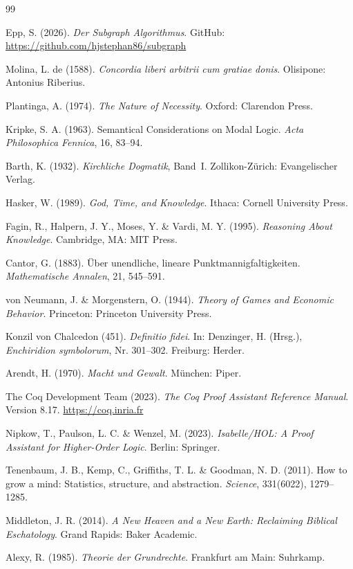 ﻿\documentclass[a4paper,12pt]{article}
\theoremstyle{definition}
\begin{document}
\begin{thebibliography}{99}

Epp, S. (2026).
\textit{Der Subgraph Algorithmus}.
GitHub: \url{https://github.com/hjstephan86/subgraph}

Molina, L. de (1588).
\textit{Concordia liberi arbitrii cum gratiae donis}.
Olisipone: Antonius Riberius.

Plantinga, A. (1974).
\textit{The Nature of Necessity}.
Oxford: Clarendon Press.

Kripke, S. A. (1963).
Semantical Considerations on Modal Logic.
\textit{Acta Philosophica Fennica}, 16, 83--94.

Barth, K. (1932).
\textit{Kirchliche Dogmatik}, Band~I.
Zollikon-Zürich: Evangelischer Verlag.

Hasker, W. (1989).
\textit{God, Time, and Knowledge}.
Ithaca: Cornell University Press.

Fagin, R., Halpern, J. Y., Moses, Y. \& Vardi, M. Y. (1995).
\textit{Reasoning About Knowledge}.
Cambridge, MA: MIT Press.

Cantor, G. (1883).
Über unendliche, lineare Punktmannigfaltigkeiten.
\textit{Mathematische Annalen}, 21, 545--591.

von Neumann, J. \& Morgenstern, O. (1944).
\textit{Theory of Games and Economic Behavior}.
Princeton: Princeton University Press.

Konzil von Chalcedon (451).
\textit{Definitio fidei}.
In: Denzinger, H. (Hrsg.),
\textit{Enchiridion symbolorum}, Nr. 301--302. Freiburg: Herder.

Arendt, H. (1970).
\textit{Macht und Gewalt}.
München: Piper.

The Coq Development Team (2023).
\textit{The Coq Proof Assistant Reference Manual}.
Version 8.17. \url{https://coq.inria.fr}

Nipkow, T., Paulson, L. C. \& Wenzel, M. (2023).
\textit{Isabelle/HOL: A Proof Assistant for Higher-Order Logic}.
Berlin: Springer.

Tenenbaum, J. B., Kemp, C., Griffiths, T. L. \& Goodman, N. D. (2011).
How to grow a mind: Statistics, structure, and abstraction.
\textit{Science}, 331(6022), 1279--1285.

Middleton, J. R. (2014).
\textit{A New Heaven and a New Earth: Reclaiming Biblical Eschatology}.
Grand Rapids: Baker Academic.

Alexy, R. (1985).
\textit{Theorie der Grundrechte}.
Frankfurt am Main: Suhrkamp.

\end{thebibliography}
\end{document}
